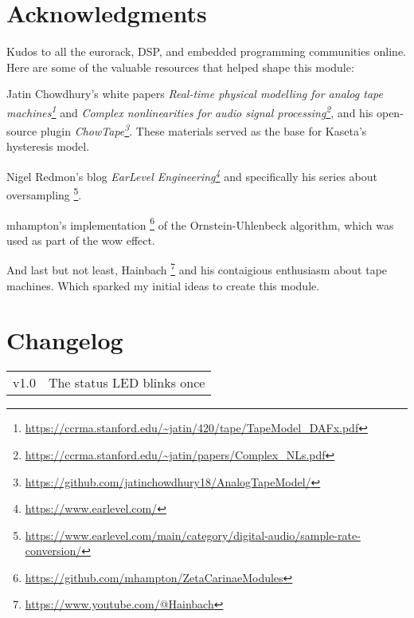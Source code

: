 \documentclass[11pt]{article}
\begin{document}
\newpage

\noindent
\begin{minipage}[t]{0.3\textwidth}
\setlength{\parskip}{6pt}
\section{Acknowledgments}

Kudos to all the eurorack, DSP, and embedded programming communities online.
Here are some of the valuable resources that helped shape this module:

Jatin Chowdhury's white papers
\textit{Real-time physical modelling for analog tape machines\footnote{
  \url{https://ccrma.stanford.edu/~jatin/420/tape/TapeModel_DAFx.pdf}
}}
and
\textit{Complex nonlinearities for audio signal processing\footnote{
  \url{https://ccrma.stanford.edu/~jatin/papers/Complex_NLs.pdf}
}},
and his open-source plugin
\textit{ChowTape\footnote{
  \url{https://github.com/jatinchowdhury18/AnalogTapeModel/}
}}. These materials served as the base for Kaseta's hysteresis model.

Nigel Redmon's blog
\textit{EarLevel Engineering\footnote{
  \url{https://www.earlevel.com/}
}}
and specifically his series about oversampling%
\footnote{\url{https://www.earlevel.com/main/category/digital-audio/sample-rate-conversion/}}.

mhampton's implementation%
\footnote{\url{https://github.com/mhampton/ZetaCarinaeModules}}
of the Ornstein-Uhlenbeck algorithm, which was used as part of the wow effect.

And last but not least, Hainbach%
\footnote{\url{https://www.youtube.com/@Hainbach}}
and his contaigious enthusiasm about tape machines. Which sparked my initial
ideas to create this module.

\vspace{2.5cm}

\end{minipage}%
\begin{minipage}{0.05\textwidth}
\phantom{ }
\end{minipage}%
\begin{minipage}[t]{0.3\textwidth}
\section{Changelog}

\begin{tabular}{@{}rl@{}}
  v1.0 & The status LED blinks once
\end{tabular}

\end{minipage}
\end{document}
